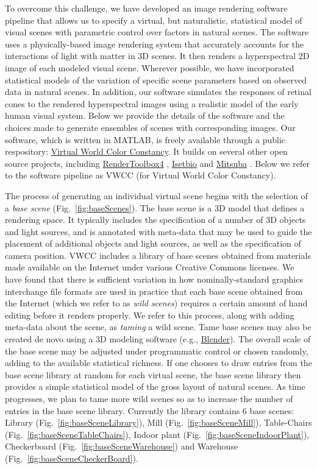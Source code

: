 \documentclass{jov}
\begin{document}
To overcome this  challenge, we have developed an image rendering software pipeline that allows us to specify a virtual, but naturalistic, statistical model of visual scenes with parametric control over factors in natural scenes. The software uses a physically-based image rendering system that accurately accounts for the interactions of light with matter in 3D scenes. It then renders a hyperspectral 2D image of each modeled visual scene. Wherever possible, we have incorporated statistical models of the variation of specific scene parameters based on observed data in natural scenes. In addition, our software simulates the responses of retinal cones to the rendered hyperspectral images using a realistic model of the early human visual system. Below we provide the details of the software and the choices made to generate ensembles of scenes with corresponding images. Our software, which is written in MATLAB, is freely available through a public respository: \href{https://github.com/BrainardLab/VirtualWorldColorConstancy}{Virtual World Color Constancy}. It builds on several other open source projects, including \href{http://rendertoolbox.org}{RenderToolbox4} \cite{heasly2014rendertoolbox3}, \href{http://isetbio.org}{Isetbio} and \href{https://www.mitsuba-renderer.org}{Mitsuba} \cite{jakob2015mitsuba}. Below we refer to the software pipeline as VWCC (for Virtual World Color Constancy).

The process of generating an individual virtual scene begins with the selection of a \textit{base scene} (Fig.~\ref{fig:baseScenes}). The base scene is a 3D model that defines a rendering space.  It typically includes the specification of a number of 3D objects and light sources, and is annotated with meta-data that may be used to guide the placement of additional objects and light sources, as well as the specification of camera position. VWCC includes a library of base scenes obtained from materials made available on the Internet under various Creative Commons licenses. We have found that there is sufficient variation in how nominally-standard graphics interchange file formats are used in practice that each base scene obtained from the Internet (which we refer to as \textit{wild scenes}) requires a certain amount of hand editing before it renders properly. We refer to this process, along with adding meta-data about the scene, as \textit{taming} a wild scene. Tame base scenes may also be created de novo using a 3D modeling software (e.g., \href{https://www.blender.org/}{Blender}).  The overall scale of the base scene may be adjusted under programmatic control or chosen randomly, adding to the available statistical richness. If one chooses to draw entries from the base scene library at random for each virtual scene, the base scene library then provides a simple statistical model of the gross layout of natural scenes. As time progresses, we plan to tame more wild scenes so as to increase the number of entries in the base scene library. Currently the library contains 6 base scenes: Library (Fig.~\ref{fig:baseSceneLibrary}), Mill (Fig.~\ref{fig:baseSceneMill}), Table-Chairs (Fig.~\ref{fig:baseSceneTableChairs}), Indoor plant (Fig.~\ref{fig:baseSceneIndoorPlant}), Checkerboard (Fig.~\ref{fig:baseSceneWarehouse}) and Warehouse (Fig.~\ref{fig:baseSceneCheckerBoard}).
\end{document}
